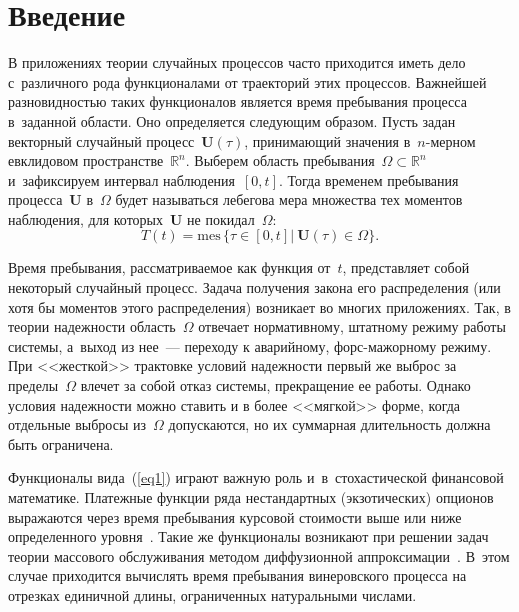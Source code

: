 
\thispagestyle{headings}

\begin{multicols}{2}

\label{st\stat}



\section{Введение}

В приложениях теории случайных процессов час\-то приходится иметь дело с~различного \mbox{рода} функционалами от траекторий этих процессов. Важнейшей разновидностью таких функционалов является время пребывания процесса в~заданной области. Оно определяется следующим образом. Пусть задан векторный случайный процесс~$\mathbf {U}(\tau)$, принимающий значения в~$n$-мер\-ном евклидовом пространстве~$\mathbb{R}^n$. Выберем об\-ласть пребывания~$\Omega \subset \mathbb{R}^n$ и~зафиксируем интервал наблюдения~$[0,t]$. Тогда временем пребывания процесса~$\mathbf{U}$ в~$\Omega$ будет называться лебегова мера множества тех моментов наблюдения, для которых~$\mathbf{U}$ не покидал~$\Omega$:
\begin{equation}
  \label{eq1}
  T(t)=\mathrm{mes}\, \{ \tau \in [0, t]|\ \mathbf{ U}(\tau) \in \Omega \}.
\end{equation}

Время пребывания, рассматриваемое как функция от~$t$, представляет собой некоторый случайный процесс. Задача получения закона его распределения (или хотя бы моментов этого распределения) возникает во многих приложениях. Так, в теории надежности область~$\Omega$ отвечает нормативному, штатному режиму работы системы, а~выход из нее~--- переходу к аварийному, форс-ма\-жор\-но\-му режиму. При <<жесткой>> трактовке условий надежности первый же выброс за пределы~$\Omega$ влечет за собой отказ системы, прекращение ее работы. Однако условия надежности можно ставить и в более <<мягкой>> форме, когда отдельные выбросы из~$\Omega$ допускаются, но их суммарная длительность должна быть огра\-ни\-чена.

Функционалы вида~(\ref{eq1}) играют важную роль и~в~стохастической финансовой математике. Платеж\-ные функции ряда нестандартных (экзотических) опционов выражаются через время пребывания курсовой стоимости выше или ниже определенного уровня~\cite{ref1}. Такие же функционалы возникают при решении задач теории массового обслуживания методом диффузионной аппроксимации~\cite{ref2}. В~этом случае приходится вычислять время пребывания винеровского процесса на отрезках единичной длины, ограниченных натуральными числами.


\end{multicols}
